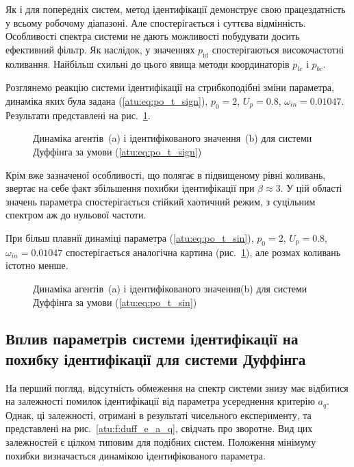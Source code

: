 Як і для попередніх систем, метод ідентифікації демонструє свою
працездатність у всьому робочому діапазоні. Але спостерігається
і суттєва відмінність. Особливості спектра системи не дають
можливості побудувати досить ефективний фільтр. Як наслідок,
у значеннях
$p_\mathrm{id}$ спостерігаються високочастотні коливання. Найбільш
схильні до цього явища методи координаторів
$p_{lc}$ і
$p_{bc}$.

Розглянемо реакцію системи ідентифікації на стрибкоподібні
зміни параметра, динаміка яких була задана (\ref{atu:eq:po_t_sign}),
$p_0=2$, $U_p=0.8$, $\omega_{in}=0.01047$.
Результати представлені на рис.~\ref{atu:f:duff_id_sign}.

\begin{figure}[ht!]
  \caption{Динаміка агентів~(a) і ідентифікованого значення~(b) для системи Дуффінга за умови (\ref{atu:eq:po_t_sign})}
\label{atu:f:duff_id_sign}
\end{figure}

Крім вже зазначеної особливості, що полягає в підвищеному рівні
коливань, звертає на себе факт збільшення похибки ідентифікації
при
$ \beta \approx 3 $. У цій області значень параметра спостерігається
стійкий хаотичний режим, з суцільним спектром аж до нульової частоти.

При більш плавнії динаміці параметра (\ref{atu:eq:po_t_sin}),
$ p_0 = 2 $,
$ U_p = 0.8 $,
$ \omega_{in} = 0.01047 $ спостерігається аналогічна картина
(рис.~\ref{atu:f:duff_id_sign}), але розмах коливань істотно менше.

\begin{figure}[ht!]
  \caption{Динаміка агентів~(a) і ідентифікованого значення(b) для системи Дуффінга за умови (\ref{atu:eq:po_t_sin})}
\label{atu:f:duff_id_sin}
\end{figure}



\subsection{Вплив параметрів системи ідентифікації на похибку ідентифікації для системи Дуффінга} %

На перший погляд, відсутність обмеження на спектр системи
знизу має відбитися на залежності помилок ідентифікації від
параметра усереднення критерію
$a_q$. Однак, ці залежності, отримані в результаті чисельного
експерименту, та представлені на рис.~\ref{atu:f:duff_e_a_q}, свідчать про
зворотне. Вид цих залежностей є цілком типовим для подібних
систем. Положення мінімуму похибки визначається динамікою
ідентифікованого параметра.

